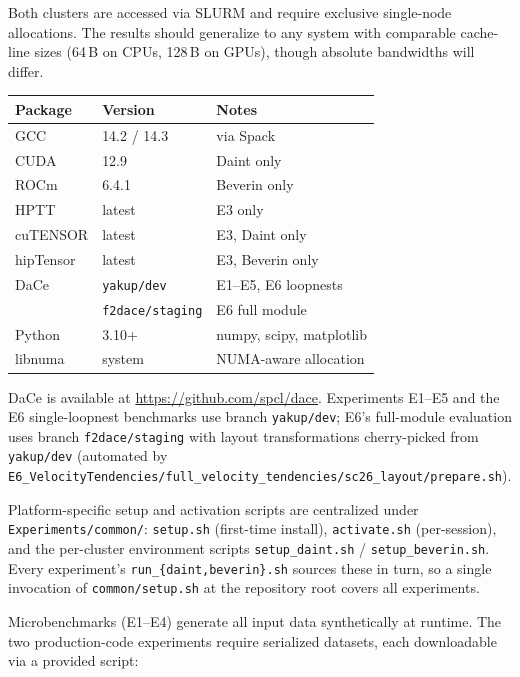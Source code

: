 \documentclass[conference]{IEEEtran}
\begin{document}
Both clusters are accessed via SLURM and require exclusive single-node allocations.
The results should generalize to any system with comparable cache-line sizes (64\,B on CPUs, 128\,B on GPUs), though absolute bandwidths will differ.


\begin{center}
\small
\begin{tabular}{lll}
\toprule
Package & Version & Notes \\
\midrule
GCC & 14.2 / 14.3 & via Spack \\
CUDA & 12.9 & Daint only \\
ROCm & 6.4.1 & Beverin only \\
HPTT & latest & E3 only \\
cuTENSOR & latest & E3, Daint only \\
hipTensor & latest & E3, Beverin only \\
DaCe & \texttt{yakup/dev} & E1--E5, E6 loopnests \\
     & \texttt{f2dace/staging} & E6 full module \\
Python & 3.10+ & numpy, scipy, matplotlib \\
libnuma & system & NUMA-aware allocation \\
\bottomrule
\end{tabular}
\end{center}

DaCe is available at \url{https://github.com/spcl/dace}.
Experiments E1--E5 and the E6 single-loopnest benchmarks use branch \texttt{yakup/dev}; E6's full-module evaluation uses branch \texttt{f2dace/staging} with layout transformations cherry-picked from \texttt{yakup/dev} (automated by \texttt{E6\_VelocityTendencies/full\_velocity\_tendencies/sc26\_layout/prepare.sh}).

Platform-specific setup and activation scripts are centralized under \texttt{Experiments/common/}:
\texttt{setup.sh} (first-time install), \texttt{activate.sh} (per-session), and the per-cluster environment scripts \texttt{setup\_daint.sh} / \texttt{setup\_beverin.sh}.
Every experiment's \texttt{run\_\{daint,beverin\}.sh} sources these in turn, so a single invocation of \texttt{common/setup.sh} at the repository root covers all experiments.


Microbenchmarks (E1--E4) generate all input data synthetically at runtime.
The two production-code experiments require serialized datasets, each downloadable via a provided script:
\end{document}
